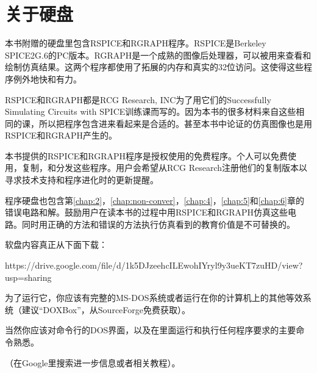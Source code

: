 \chapter*{关于硬盘}
本书附赠的硬盘里包含RSPICE和RGRAPH程序。RSPICE是Berkeley SPICE2G.6的PC版本。RGRAPH是一个成熟的图像后处理器，可以被用来查看和绘制仿真结果。这两个程序都使用了拓展的内存和真实的32位访问。这使得这些程序例外地快和有力。

RSPICE和RGRAPH都是RCG Research, INC为了用它们的Successfully Simulating Circuits with SPICE训练课而写的。因为本书的很多材料来自这些相同的课，所以把程序包含进来看起来是合适的。甚至本书中论证的仿真图像也是用RSPICE和RGRAPH产生的。

本书提供的RSPICE和RGRAPH程序是授权使用的免费程序。个人可以免费使用，复制，和分发这些程序。用户会希望从RCG Research注册他们的复制版本以寻求技术支持和程序进化时的更新提醒。

程序硬盘也包含第\ref{chap:2}，\ref{chap:non-conver}，\ref{chap:4}，\ref{chap:5}和\ref{chap:6}章的错误电路和解。鼓励用户在读本书的过程中用RSPICE和RGRAPH仿真这些电路。同时用正确的方法和错误的方法执行仿真看到的教育价值是不可替换的。

软盘内容真正从下面下载：

https://drive.google.com/file/d/1k5DJzeehcILEwohIYryl9y3ueKT7zuHD/view?usp=sharing

为了运行它，你应该有完整的MS-DOS系统或者运行在你的计算机上的其他等效系统（建议“DOXBox”，从SourceForge免费获取）。

当然你应该对命令行的DOS界面，以及在里面运行和执行任何程序要求的主要命令熟悉。

（在Google里搜索进一步信息或者相关教程）。